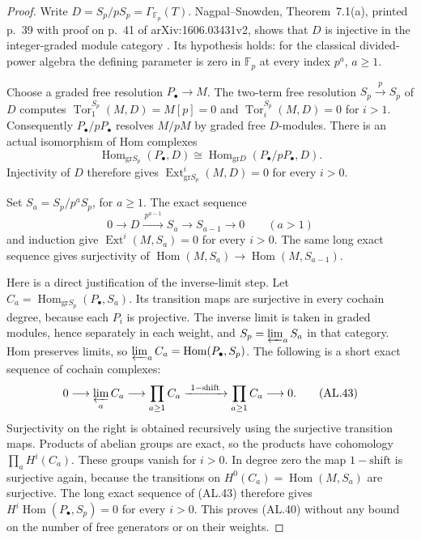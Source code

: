 \begin{proof}
Write $D=S_p/pS_p=\Gamma_{\mathbb F_p}(T)$.
Nagpal--Snowden, Theorem~7.1(a), printed p.~39 with
proof on p.~41 of arXiv:1606.03431v2,
shows that $D$ is injective in the integer-graded module
category \cite{IC-nagpal-snowden}.  Its hypothesis holds:
for the classical divided-power algebra the defining
parameter is zero in $\mathbb F_p$ at every index $p^a$,
$a\geq1$.

Choose a graded free resolution $P_\bullet\to M$.
The two-term free resolution
$S_p\xrightarrow{p}S_p$ of $D$ computes
$\operatorname{Tor}^{S_p}_1(M,D)=M[p]=0$ and
$\operatorname{Tor}^{S_p}_i(M,D)=0$ for $i>1$.
Consequently $P_\bullet/pP_\bullet$ resolves $M/pM$
by graded free $D$-modules.  There is an actual
isomorphism of Hom complexes
\[
 \operatorname{Hom}_{\mathrm{gr}S_p}(P_\bullet,D)
 \cong
 \operatorname{Hom}_{\mathrm{gr}D}
             (P_\bullet/pP_\bullet,D).
 \tag{AL.42}
\]
Injectivity of $D$ therefore gives
$\operatorname{Ext}^{i}_{\mathrm{gr}S_p}(M,D)=0$
for every $i>0$.

Set $S_a=S_p/p^aS_p$, for $a\geq1$.
The exact sequence
\[
 0\longrightarrow D\xrightarrow{\ p^{a-1}\ }S_a
          \longrightarrow S_{a-1}\longrightarrow0
 \qquad(a>1)
\]
and induction give $\operatorname{Ext}^i(M,S_a)=0$
for every $i>0$.  The same long exact sequence gives
surjectivity of
$\operatorname{Hom}(M,S_a)\to\operatorname{Hom}(M,S_{a-1})$.

Here is a direct justification of the inverse-limit step.
Let $C_a=\operatorname{Hom}_{\mathrm{gr}S_p}(P_\bullet,S_a)$.
Its transition maps are surjective in every cochain degree,
because each $P_i$ is projective.  The inverse limit is taken
in graded modules, hence separately in each weight, and
$S_p=\varprojlim_a S_a$ in that category.  Hom preserves
limits, so
$\varprojlim_a C_a=\operatorname{Hom}(P_\bullet,S_p)$.
The following is a short exact sequence of cochain complexes:
\[
 0\longrightarrow\varprojlim_a C_a\longrightarrow
 \prod_{a\geq1}C_a
 \xrightarrow{\ 1-\mathrm{shift}\ }
 \prod_{a\geq1}C_a\longrightarrow0.
 \tag{AL.43}
\]
Surjectivity on the right is obtained recursively using the
surjective transition maps.  Products of abelian groups are
exact, so the products have cohomology
$\prod_a H^i(C_a)$.  These groups vanish for $i>0$.
In degree zero the map $1-\mathrm{shift}$ is surjective
again, because the transitions on
$H^0(C_a)=\operatorname{Hom}(M,S_a)$ are surjective.
The long exact sequence of \textup{(AL.43)} therefore gives
$H^i\operatorname{Hom}(P_\bullet,S_p)=0$ for every $i>0$.
This proves \textup{(AL.40)} without any bound on the
number of free generators or on their weights.


\end{proof}
